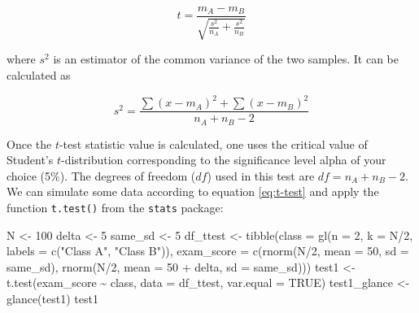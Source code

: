 \documentclass[
  11pt,
  a4paper,
  twoside]{scrbook}
\newenvironment{Shaded}{\begin{snugshade}}{\end{snugshade}}
\newcommand{\AttributeTok}[1]{\textcolor[rgb]{0.77,0.63,0.00}{#1}}
\newcommand{\ConstantTok}[1]{\textcolor[rgb]{0.00,0.00,0.00}{#1}}
\newcommand{\DecValTok}[1]{\textcolor[rgb]{0.00,0.00,0.81}{#1}}
\newcommand{\FunctionTok}[1]{\textcolor[rgb]{0.00,0.00,0.00}{#1}}
\newcommand{\NormalTok}[1]{#1}
\newcommand{\OtherTok}[1]{\textcolor[rgb]{0.56,0.35,0.01}{#1}}
\newcommand{\SpecialCharTok}[1]{\textcolor[rgb]{0.00,0.00,0.00}{#1}}
\newcommand{\StringTok}[1]{\textcolor[rgb]{0.31,0.60,0.02}{#1}}
\begin{document}
\begin{equation} 
  t = \frac{m_A - m_B}{\sqrt{ \frac{s^2}{n_A} + \frac{s^2}{n_B} }}
  \label{eq:t-test}
\end{equation}

where \(s^2\) is an estimator of the common variance of the two samples. It can be calculated as

\begin{equation} 
  s^2 = \frac{\sum{(x-m_A)^2}+\sum{(x-m_B)^2}}{n_A+n_B-2}
  \label{eq:t-test-s}
\end{equation}

Once the \(t\)-test statistic value is calculated, one uses the critical value of Student's \(t\)-distribution corresponding to the significance level alpha of your choice (5\%). The degrees of freedom (\(df\)) used in this test are \(df = n_A + n_B - 2\). We can simulate some data according to equation \eqref{eq:t-test} and apply the function \texttt{t.test()} from the \texttt{stats} package:

\linespread{1}

\begin{Shaded}
\begin{Highlighting}[]
\NormalTok{N }\OtherTok{\textless{}{-}} \DecValTok{100}
\NormalTok{delta }\OtherTok{\textless{}{-}} \DecValTok{5}
\NormalTok{same\_sd }\OtherTok{\textless{}{-}} \DecValTok{5}
\NormalTok{df\_ttest }\OtherTok{\textless{}{-}} \FunctionTok{tibble}\NormalTok{(}\AttributeTok{class =} \FunctionTok{gl}\NormalTok{(}\AttributeTok{n =} \DecValTok{2}\NormalTok{, }\AttributeTok{k =}\NormalTok{ N}\SpecialCharTok{/}\DecValTok{2}\NormalTok{, }\AttributeTok{labels =} \FunctionTok{c}\NormalTok{(}\StringTok{"Class A"}\NormalTok{, }\StringTok{"Class B"}\NormalTok{)),}
                   \AttributeTok{exam\_score =} \FunctionTok{c}\NormalTok{(}\FunctionTok{rnorm}\NormalTok{(N}\SpecialCharTok{/}\DecValTok{2}\NormalTok{, }\AttributeTok{mean =} \DecValTok{50}\NormalTok{, }\AttributeTok{sd =}\NormalTok{ same\_sd),}
                                  \FunctionTok{rnorm}\NormalTok{(N}\SpecialCharTok{/}\DecValTok{2}\NormalTok{, }\AttributeTok{mean =} \DecValTok{50} \SpecialCharTok{+}\NormalTok{ delta, }\AttributeTok{sd =}\NormalTok{ same\_sd)))}
\NormalTok{test1 }\OtherTok{\textless{}{-}} \FunctionTok{t.test}\NormalTok{(exam\_score }\SpecialCharTok{\textasciitilde{}}\NormalTok{ class, }\AttributeTok{data =}\NormalTok{ df\_ttest, }\AttributeTok{var.equal =} \ConstantTok{TRUE}\NormalTok{)}
\NormalTok{test1\_glance }\OtherTok{\textless{}{-}} \FunctionTok{glance}\NormalTok{(test1)}
\NormalTok{test1}
\end{Highlighting}
\end{Shaded}
\end{document}

